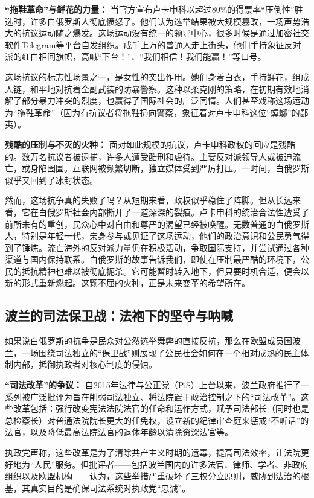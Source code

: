 \documentclass[UTF8, 10pt]{ctexbook}
\begin{document}
\textbf{“拖鞋革命”与鲜花的力量：} 当官方宣布卢卡申科以超过80\%的得票率“压倒性”胜选时，许多白俄罗斯人彻底愤怒了。他们认为选举结果被大规模篡改，一场声势浩大的抗议运动随之爆发。这场运动没有统一的领导中心，很多时候是通过加密社交软件Telegram等平台自发组织。成千上万的普通人走上街头，他们手持象征反对派的红白相间旗帜，高喊“下台！”、“我们相信！我们能赢！”等口号。

这场抗议的标志性场景之一，是女性的突出作用。她们身着白衣，手持鲜花，组成人链，和平地对抗着全副武装的防暴警察。这种以柔克刚的策略，在初期有效地消解了部分暴力冲突的烈度，也赢得了国际社会的广泛同情。人们甚至戏称这场运动为“拖鞋革命”（因为有抗议者将拖鞋扔向警察，象征着对卢卡申科这位“蟑螂”的鄙夷）。

\textbf{残酷的压制与不灭的火种：} 面对如此规模的抗议，卢卡申科政权的回应是残酷的。数万名抗议者被逮捕，许多人遭受酷刑和虐待。主要反对派领导人或被迫流亡，或身陷囹圄。互联网被频繁切断，独立媒体受到严厉打压。一时间，白俄罗斯似乎又回到了冰封状态。

然而，这场抗争真的失败了吗？从短期来看，政权似乎稳住了阵脚。但从长远来看，它在白俄罗斯社会内部撕开了一道深深的裂痕。卢卡申科的统治合法性遭受了前所未有的重创，民众心中对自由和尊严的渴望已经被唤醒。无数普通的白俄罗斯人，特别是年轻一代，亲身参与或见证了这场运动，他们的政治意识和公民勇气得到了锤炼。流亡海外的反对派力量仍在积极活动，争取国际支持，并尝试通过各种渠道与国内保持联系。白俄罗斯的故事告诉我们，即使在压制最严酷的环境下，公民的抵抗精神也难以被彻底扼杀。它可能暂时转入地下，但只要时机合适，便会以新的形式重新燃起。这颗不屈的火种，正是未来变革的希望所在。

\subsection{波兰的司法保卫战：法袍下的坚守与呐喊}
如果说白俄罗斯的抗争是民众对公然选举舞弊的直接反抗，那么在欧盟成员国波兰，一场围绕司法独立的“保卫战”则展现了公民社会如何在一个相对成熟的民主体制内部，抵御执政者对核心制度的侵蚀。

\textbf{“司法改革”的争议：} 自2015年法律与公正党（PiS）上台以来，波兰政府推行了一系列被广泛批评为旨在削弱司法独立、将法院置于政治控制之下的“司法改革”。这些改革包括：强行改变宪法法院法官的任命和运作方式，赋予司法部长（同时也是总检察长）对普通法院院长更大的任免权，设立新的纪律审查庭来惩戒“不听话”的法官，以及降低最高法院法官的退休年龄以清除资深法官等。

执政党声称，这些改革是为了清除共产主义时期的遗毒，提高司法效率，让法院更好地为“人民”服务。但批评者——包括波兰国内的许多法官、律师、学者、非政府组织以及欧盟机构——认为，这些举措严重破坏了三权分立原则，威胁到法治的根基，其真实目的是确保司法系统对执政党“忠诚”。
\end{document}
